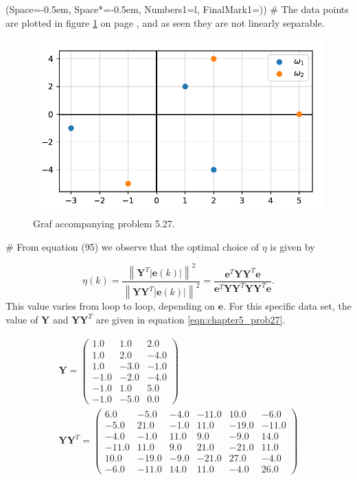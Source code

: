 \documentclass[12pt, a4paper]{article}
\newcommand{\listSpace}{-0.5em}%
\newcommand{\vect}[1]{\bm{#1}}
\newcommand{\norm}[1]{\left\lVert#1\right\rVert}
\newcommand{\abs}[1]{\left\lvert#1\right\rvert}
\begin{document}
\begin{easylist}[enumerate]
\ListProperties(Space=\listSpace, Space*=\listSpace, Numbers1=l, FinalMark1={)})
# The data points are plotted in figure \ref{fig:duda_ch5_prob27} on page \pageref{fig:duda_ch5_prob27}, and as seen they are not linearly separable.


\begin{figure}[ht!]
	\centering
	\includegraphics[width=0.5\linewidth]{figs/duda_ch5_prob27}
	\caption{Graf accompanying problem 5.27.}
	\label{fig:duda_ch5_prob27}
\end{figure}


# From equation (95) we observe that the optimal choice of $\eta$ is given by

\begin{equation*}
	\eta(k) = \frac{\norm{\vect{Y}^T \abs{\vect{e}(k)}}^2}
	{\norm{\vect{Y}\vect{Y}^T \abs{\vect{e}(k)}}^2}
	= \frac{\vect{e}^T \vect{Y} \vect{Y}^T \vect{e}}
	{\vect{e}^T \vect{Y} \vect{Y}^T \vect{Y} \vect{Y}^T \vect{e}}.
\end{equation*}
This value varies from loop to loop, depending on $\vect{e}$.
For this specific data set, the value of $\vect{Y}$ and $\vect{Y} \vect{Y}^T$ are given in equation \eqref{eqn:chapter5_prob27}.

\begin{gather*}
\label{eqn:chapter5_prob27}
	\vect{Y} = \left(\begin{matrix}
	1.0 & 1.0 & 2.0\\1.0 & 2.0 & -4.0\\1.0 & -3.0 & -1.0\\-1.0 & -2.0 & -4.0\\-1.0 & 1.0 & 5.0\\-1.0 & -5.0 & 0.0
	\end{matrix}\right)
	\\
	\vect{Y} \vect{Y}^T = 
	\left(\begin{matrix}
	6.0 & -5.0 & -4.0 & -11.0 & 10.0 & -6.0\\-5.0 & 21.0 & -1.0 & 11.0 & -19.0 & -11.0\\-4.0 & -1.0 & 11.0 & 9.0 & -9.0 & 14.0\\-11.0 & 11.0 & 9.0 & 21.0 & -21.0 & 11.0\\10.0 & -19.0 & -9.0 & -21.0 & 27.0 & -4.0\\-6.0 & -11.0 & 14.0 & 11.0 & -4.0 & 26.0
	\end{matrix}\right)
\end{gather*}


\end{easylist}
\end{document}
